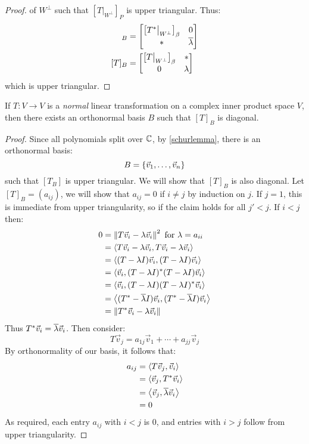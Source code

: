 \begin{proof}
  of $W^\perp$ such that $\left[T\big\rvert_{W^{\perp}}\right]_P$ is upper triangular. Thus:
  \begin{align}
    [T^*]_B &= \begin{bmatrix}
      \left[T^*\big\rvert_{W^\perp}\right]_\beta & 0 \\
      * & \conj{\lambda}
    \end{bmatrix} \\
    [T]_B &= \begin{bmatrix}
      \left[T\big\rvert_{W^\perp}\right]_\beta & * \\
      0 & \lambda
    \end{bmatrix}
  \end{align}
  which is upper triangular.
\end{proof}

\begin{theorem}\label{complexorthonormaldiagthm}
  If $T : V \to V$ is a \emph{normal} linear transformation on a complex inner product space $V$,
  then there exists an orthonormal basis $B$ such that $[T]_B$ is diagonal.
\end{theorem}
\begin{proof}
  Since all polynomials split over $\mathbb{C}$, by \ref{schurlemma}, there is an orthonormal basis:
    $$B = \left\{\vec v_1, \ldots, \vec v_n\right\}$$
  such that $[T_B]$ is upper triangular. We will show that $[T]_B$ is also diagonal.
  Let $[T]_B = (a_{ij})$, we will show that $a_{ij} = 0$ if $i \ne j$ by induction on $j$.
  If $j = 1$, this is immediate from upper triangularity, so if the claim holds for all $j' < j$. If $i < j$ then:
    \begin{align}
      0 &= \left\lVert T \vec v_i - \lambda \vec v_i\right\rVert^2 \text{ for } \lambda = a_{ii} \\
        &= \left\langle T \vec v_i - \lambda \vec v_i , T \vec v_i - \lambda \vec v_i \right\rangle \\
        &= \left\langle (T-\lambda I)\vec v_i , (T-\lambda I)\vec v_i \right\rangle \\
        &= \left\langle \vec v_i , (T-\lambda I)^*(T - \lambda I)\vec v_i \right\rangle \\
        &= \left\langle \vec v_i , (T-\lambda I)(T - \lambda I)^* \vec v_i \right\rangle \\
        &= \left\langle (T^* - \overline{\lambda} I)\vec v_i , (T^* - \overline{\lambda} I)\vec v_i \right\rangle \\
        &= \left\lVert T^* \vec v_i - \lambda \vec v_i\right\rVert
    \end{align}
  Thus $T^* \vec v_i = \overline{\lambda} \vec v_i$. Then consider:
    $$T \vec v_j = a_{1j}\vec v_1 + \cdots + a_{jj}\vec v_j$$
  By orthonormality of our basis, it follows that:
    \begin{align}
      a_{ij} &= \left\langle T\vec v_j , \vec v_i \right\rangle \\
             &= \left\langle \vec v_j , T^* \vec v_i \right\rangle \\
             &= \left\langle \vec v_j , \overline{\lambda} \vec v_i \right\rangle \\
             &= 0
    \end{align}
  As required, each entry $a_{ij}$ with $i < j$ is 0, and entries with $i > j$ follow from upper triangularity.
\end{proof}

